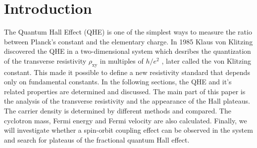 \section{Introduction}
The Quantum Hall Effect (QHE) is one of the simplest ways to measure the ratio between Planck's constant 
and the elementary charge. In 1985 Klaus von Klitzing discovered the QHE in a two-dimensional system which
desribes the quantization of the transverse resistivity $\rho_\text{xy}$ in multiples of $h/e^2$ \cite{Nobelpreis}, later called the von 
Klitzing constant.
This made it possible to define a new resistivity standard that depends only on fundamental constants. 
In the following sections, the QHE and it's related properties are determined and discussed. 
The main part of this paper is the analysis of the transverse resistivity and the appearance of the Hall plateaus.
The carrier density is determined by different methods and compared. 
The cyclotron mass, Fermi energy and Fermi velocity are also calculated.
Finally, we will investigate whether a spin-orbit coupling effect can be observed 
in the system and search for plateaus of the fractional quantum Hall effect.\\


